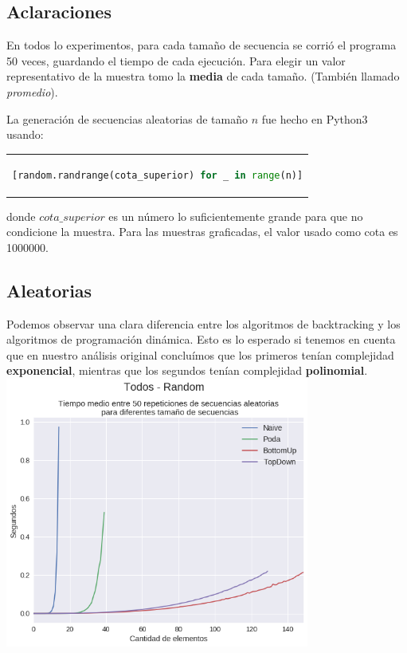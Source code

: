 \subsection{Aclaraciones}
En todos lo experimentos, para cada tamaño de secuencia se corrió el programa 50 veces, guardando el tiempo de cada ejecución. Para elegir un valor representativo de la muestra tomo la \textbf{media} de cada tamaño. (También llamado \textit{promedio}).

La generación de secuencias aleatorias de tamaño $n$ fue hecho en Python3 usando: 
\begin{center}
\begin{tabular}{c}
\begin{lstlisting}[language=Python]
[random.randrange(cota_superior) for _ in range(n)]
\end{lstlisting}
\end{tabular}
\end{center}

donde $cota\_superior$ es un número lo suficientemente grande para que no condicione la muestra. Para las muestras graficadas, el valor usado como cota es 1000000.

\subsection{Aleatorias}

Podemos observar una clara diferencia entre los algoritmos de backtracking y los algoritmos de programación dinámica. Esto es lo esperado si tenemos en cuenta que en nuestro análisis original concluímos que los primeros tenían complejidad \textbf{exponencial}, mientras que los segundos tenían complejidad \textbf{polinomial}. \\

{\centering
  \includegraphics[width=0.75\textwidth]{informe/img/experimentos/todos-random.png} \\
} 

